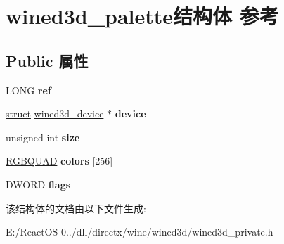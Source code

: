 \hypertarget{structwined3d__palette}{}\section{wined3d\+\_\+palette结构体 参考}
\label{structwined3d__palette}
\subsection*{Public 属性}
\begin{DoxyCompactItemize}
\item 
\mbox{\label{structwined3d__palette_aa9d43113d2bd8d97a98c61c5a0343310}} 
L\+O\+NG {\bfseries ref}
\item 
\mbox{\label{structwined3d__palette_a325e95bd6e3f453b488a5f8c80c6e2b9}} 
\hyperlink{interfacestruct}{struct} \hyperlink{structwined3d__device}{wined3d\+\_\+device} $\ast$ {\bfseries device}
\item 
\mbox{\label{structwined3d__palette_a6033b9815752aa1fb4f6fb9644243451}} 
unsigned int {\bfseries size}
\item 
\mbox{\label{structwined3d__palette_a01a76e02f255de106e54e58ce3c39cc8}} 
\hyperlink{structtag_r_g_b_q_u_a_d}{R\+G\+B\+Q\+U\+AD} {\bfseries colors} \mbox{[}256\mbox{]}
\item 
\mbox{\label{structwined3d__palette_aaef493f008155b4d0bdb37540a9d4f9a}} 
D\+W\+O\+RD {\bfseries flags}
\end{DoxyCompactItemize}


该结构体的文档由以下文件生成\+:\begin{DoxyCompactItemize}
\item 
E\+:/\+React\+O\+S-\/0../dll/directx/wine/wined3d/wined3d\+\_\+private.\+h\end{DoxyCompactItemize}
